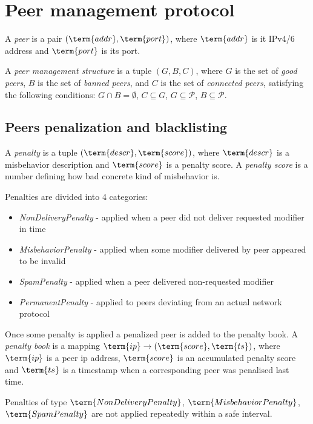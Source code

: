 \section{Peer management protocol}\label{sec:peer-management-protocol}

\newcommand{\peers}{\mathcal{P}}

A \emph{peer} is a pair $(\term{addr}, \term{port})$,
where $\term{addr}$ is it IPv4/6 address and $\term{port}$ is its port.

A \emph{peer management structure} is a tuple $(G, B, C)$,
where $G$ is the set of \emph{good peers}, $B$ is the set of \emph{banned peers}, and
$C$ is the set of \emph{connected peers}, satisfying the following conditions:
$G \cap B = \emptyset$,
$C \subseteq G$,
$G \subseteq \peers$,
$B \subseteq \peers$.

\subsection{Peers penalization and blacklisting}\label{subsec:peers-penalization-and-blacklisting}

A \emph{penalty} is a tuple $(\term{descr}, \term{score})$, where $\term{descr}$ is a misbehavior
description and $\term{score}$ is a penalty score.
A \emph{penalty score} is a number defining how bad concrete kind of misbehavior is.

Penalties are divided into 4 categories:

\begin{itemize}
    \item{\em NonDeliveryPenalty} - applied when a peer did not deliver requested modifier in time
    \item{\em MisbehaviorPenalty} - applied when some modifier delivered by peer appeared to be invalid
    \item{\em SpamPenalty} - applied when a peer delivered non-requested modifier
    \item{\em PermanentPenalty} - applied to peers deviating from an actual network protocol
\end{itemize}

Once some penalty is applied a penalized peer is added to the penalty book.
A \emph{penalty book} is a mapping $\term{ip} \rightarrow (\term{score}, \term{ts})$, where $\term{ip}$
is a peer ip address, $\term{score}$ is an accumulated penalty score and $\term{ts}$ is a timestamp when a corresponding
peer was penalised last time.

Penalties of type $\term{NonDeliveryPenalty}$, $\term{MisbehaviorPenalty}$, $\term{SpamPenalty}$ are not applied
repeatedly within a safe interval.

